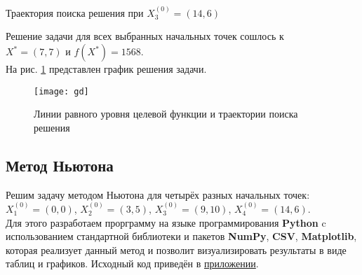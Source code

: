 \begin{table}[H]
\begin{center}
	\caption{Траектория поиска решения при $X_3^{(0)} = (14, 6)$}
	\label{tab:trajectory-gd-3}
	\def\tabcolsep{10pt}
	\def\arraystretch{1.23}
	\fontsize{13}{14}\selectfont
\end{center}
\end{table}

Решение задачи для всех выбранных начальных точек сошлось к\\ $X^* = (7, 7)$ и $f(X^*) = 1568$.\\

На рис. \ref{pic:gd} представлен график решения задачи.

\begin{figure}[H]
\begin{center}
	\texttt{[image: gd]}
	\caption{Линии равного уровня целевой функции и траектории поиска решения}
	\label{pic:gd}
\end{center}
\end{figure}

\subsection{Метод Ньютона}

Решим задачу методом Ньютона для четырёх разных начальных точек: $X_1^{(0)} = (0, 0)$, $X_2^{(0)} = (3, 5)$, $X_3^{(0)} = (9, 10)$, $X_4^{(0)} = (14, 6)$.\\

Для этого разработаем прорграмму на языке программирования \textbf{Python} c использованием стандартной библиотеки и пакетов \textbf{NumPy}, \textbf{CSV}, \textbf{Matplotlib}, которая реализует данный метод и позволит визуализировать результаты в виде таблиц и графиков.  Исходный код приведён в \hyperref[sec:application]{приложении}.\\

